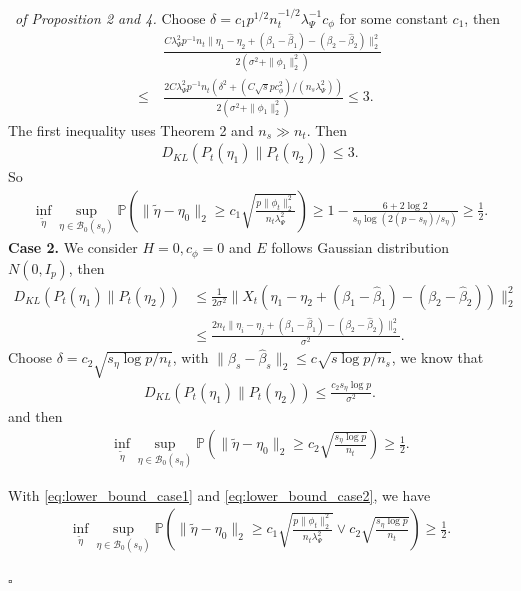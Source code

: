 \documentclass[12pt]{article}
\newenvironment{pf}{{\noindent \it Proof}\ }{\hfill $\square$\par}
\begin{document}
\begin{pf}{\it of Proposition 2 and 4. }
    Choose $\delta = c_1 p^{1/2}n_t^{-1/2}\lambda_\Psi^{-1}c_\phi$ for some constant $c_1$, then
    \begin{align*}
        &\frac{C\lambda_\Psi^2 p^{-1}n_t\|\eta_1-\eta_2+ (\beta_1 -\hat{\beta}_1) - (\beta_2 -\hat{\beta}_2)\|^2_2}{2(\sigma^2 + \|\phi_1\|_2^2)} \\\le \ &
        \frac{2C\lambda_\Psi^2 p^{-1} n_t\left(\delta^2 +  (C\sqrt{s}pc_\phi^2)/(n_s\lambda_\Psi^2)\right)}{2(\sigma^2 + \|\phi_1\|_2^2)}
        \le 3. 
    \end{align*}
    The first inequality uses Theorem 2 and $n_s\gg n_t$. Then
    \begin{align*}
        D_{KL}(P_t(\eta_1)\|P_t(\eta_2)) \le 3.
    \end{align*}
    So
    \begin{align}
         \inf_{\tilde{\eta}}\sup
        _{\eta\in \mathcal{B}_0(s_\eta)}\mathbb{P}\left(\|\tilde{\eta}-\eta_0\|_2 \ge c_1 \sqrt{\frac{p\|\phi_t\|_2^2}{n_t\lambda_\Psi^2}}\right) \ge 1- \frac{6 +2\log 2}{s_\eta\log (2(p-s_\eta)/s_\eta)} \ge \frac{1}{2}.\label{eq:lower_bound_case1}
    \end{align}
    \textbf{Case 2. }
    We consider $H=0,c_\phi=0$ and $E$ follows Gaussian distribution $N(0,I_p)$, then
    \begin{align*}
        D_{KL}(P_t(\eta_1)\|P_t(\eta_2)) & \le \frac{1}{2\sigma^2}\|X_t(\eta_1-\eta_2 + (\beta_1 -\hat{\beta}_1) - (\beta_2 -\hat{\beta}_2))\|_2^2 \\& \le 
        \frac{2n_t \|\eta_i-\eta_j + (\beta_1 -\hat{\beta}_1) - (\beta_2 -\hat{\beta}_2)\|_2^2}{\sigma^2}. 
    \end{align*}
    Choose $\delta = c_2\sqrt{s_\eta \log p/n_t}$, with $\|\beta_s - \hat{\beta}_s\|_2 \le c\sqrt{s\log p/n_s}$, we know that 
    \begin{align*}
        D_{KL}(P_t(\eta_1)\|P_t(\eta_2)) \le \frac{c_2s_\eta \log p}{\sigma^2}. 
    \end{align*}
    and then 
    \begin{align}
        \inf_{\tilde{\eta}}\sup
        _{\eta\in \mathcal{B}_0(s_\eta)}\mathbb{P}\left(\|\tilde{\eta}-\eta_0\|_2 \ge c_2\sqrt{\frac{s_\eta\log p}{n_t}}\right) \ge \frac{1}{2}.\label{eq:lower_bound_case2}
    \end{align}

    With \eqref{eq:lower_bound_case1} and \eqref{eq:lower_bound_case2}, we have
    \begin{align*}
         \inf_{\tilde{\eta}}\sup
        _{\eta\in \mathcal{B}_0(s_\eta)}\mathbb{P}\left(\|\tilde{\eta}-\eta_0\|_2 \ge c_1 \sqrt{\frac{p\|\phi_t\|_2^2}{n_t\lambda_\Psi^2}} \vee c_2\sqrt{\frac{s_\eta\log p}{n_t}}\right) \ge \frac{1}{2}.
    \end{align*}


\end{pf}
\end{document}
